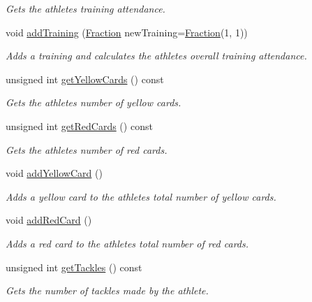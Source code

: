 \begin{DoxyCompactItemize}
\begin{DoxyCompactList}\small\item\em Gets the athlete\textquotesingle{}s training attendance. \end{DoxyCompactList}\item 
void \hyperlink{class_info_acbd13c7c7b330089ab211158a5bc6c13}{add\+Training} (\hyperlink{class_fraction}{Fraction} new\+Training=\hyperlink{class_fraction}{Fraction}(1, 1))
\begin{DoxyCompactList}\small\item\em Adds a training and calculates the athlete\textquotesingle{}s overall training attendance. \end{DoxyCompactList}\item 
unsigned int \hyperlink{class_info_ab357ec119b1281b94e37a1a853e1d149}{get\+Yellow\+Cards} () const
\begin{DoxyCompactList}\small\item\em Gets the athlete\textquotesingle{}s number of yellow cards. \end{DoxyCompactList}\item 
unsigned int \hyperlink{class_info_aac0891ef0f8767df1b5782ed108610de}{get\+Red\+Cards} () const
\begin{DoxyCompactList}\small\item\em Gets the athlete\textquotesingle{}s number of red cards. \end{DoxyCompactList}\item 
void \hyperlink{class_info_a414d2bf966a75da821b708bec2ec612d}{add\+Yellow\+Card} ()
\begin{DoxyCompactList}\small\item\em Adds a yellow card to the athlete\textquotesingle{}s total number of yellow cards. \end{DoxyCompactList}\item 
void \hyperlink{class_info_acbfe3707047b1a4f7b9b8442797cbaa3}{add\+Red\+Card} ()
\begin{DoxyCompactList}\small\item\em Adds a red card to the athlete\textquotesingle{}s total number of red cards. \end{DoxyCompactList}\item 
unsigned int \hyperlink{class_info_abab4dbd4bf56022685e1984fffb00c60}{get\+Tackles} () const
\begin{DoxyCompactList}\small\item\em Gets the number of tackles made by the athlete. \end{DoxyCompactList}\item 

\end{DoxyCompactItemize}
